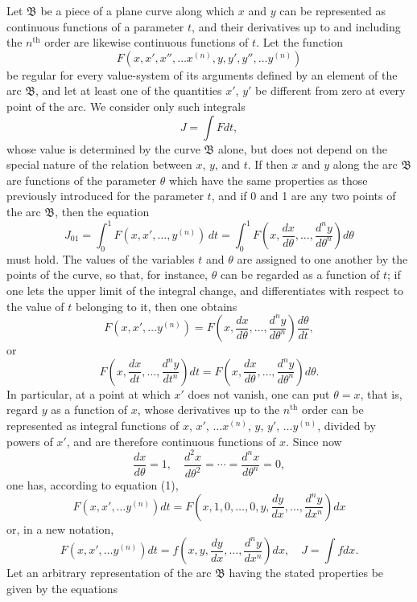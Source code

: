 \documentclass[11pt,a4paper,leqno]{article}
\begin{document}
Let $\mathfrak B$ be a piece of a plane curve along which $x$ and $y$ can be represented as continuous functions of a parameter $t$, and their derivatives up to and including the $n^{\mathrm{th}}$ order are likewise continuous functions of $t$. Let the function
\[
F(x,x',x'',\ldots x^{(n)},y,y',y'',\ldots y^{(n)})
\]
be regular for every value-system of its arguments defined by an element of the arc $\mathfrak B$, and let at least one of the quantities $x'$, $y'$ be different from zero at every point of the arc. We consider only such integrals
\[
J=\int Fdt,
\]
whose value is determined by the curve $\mathfrak B$ alone, but does not depend on the special nature of the relation between $x$, $y$, and $t$. If then $x$ and $y$ along the arc $\mathfrak B$ are functions of the parameter $\theta$ which have the same properties as those previously introduced for the parameter $t$, and if 0 and 1 are any two points of the arc $\mathfrak B$, then the equation
\[
J_{01}=\int_0^1 F(x,x',\ldots,y^{(n)})\,dt
=\int_0^1 F\left(x,\frac{dx}{d\theta},\ldots,\frac{d^ny}{d\theta^n}\right)d\theta
\]
must hold. The values of the variables $t$ and $\theta$ are assigned to one another by the points of the curve, so that, for instance, $\theta$ can be regarded as a function of $t$; if one lets the upper limit of the integral change, and differentiates with respect to the value of $t$ belonging to it, then one obtains
\[
F(x,x',\ldots y^{(n)})
=F\left(x,\frac{dx}{d\theta},\ldots,\frac{d^ny}{d\theta^n}\right)\frac{d\theta}{dt},
\]
or
\begin{equation}\tag{1}
F\left(x,\frac{dx}{dt},\ldots,\frac{d^ny}{dt^n}\right)dt
=F\left(x,\frac{dx}{d\theta},\ldots,\frac{d^ny}{d\theta^n}\right)d\theta.
\end{equation}
In particular, at a point at which $x'$ does not vanish, one can put $\theta=x$, that is, regard $y$ as a function of $x$, whose derivatives up to the $n^{\mathrm{th}}$ order can be represented as integral functions of $x$, $x'$, $\ldots x^{(n)}$, $y$, $y'$, $\ldots y^{(n)}$, divided by powers of $x'$, and are therefore continuous functions of $x$. Since now
\[
\frac{dx}{d\theta}=1,
\quad
\frac{d^2x}{d\theta^2}=\cdots=\frac{d^nx}{d\theta^n}=0,
\]
one has, according to equation (1),
\[
F(x,x',\ldots y^{(n)})dt
=F\left(x,1,0,\ldots,0,y,\frac{dy}{dx},\ldots,\frac{d^ny}{dx^n}\right)dx
\]
or, in a new notation,
\[
F(x,x',\ldots y^{(n)})dt
=f\left(x,y,\frac{dy}{dx},\ldots,\frac{d^ny}{dx^n}\right)dx,
\quad J=\int fdx.
\]
Let an arbitrary representation of the arc $\mathfrak B$ having the stated properties be given by the equations
\end{document}
